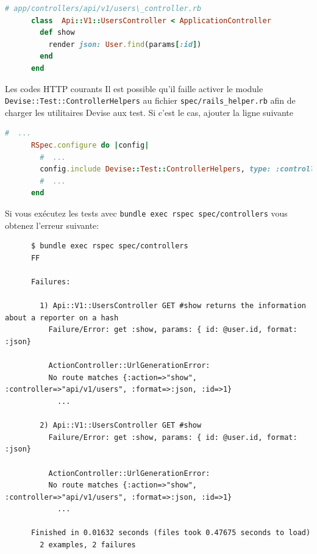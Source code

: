 \documentclass[]{report}
\begin{document}
    \begin{scriptsize}
      \begin{lstlisting}[language=ruby, caption={Le contrôlleur des utilisateurs avec l'action' 'show'}, label={lst:add_show_to_users_controller_spec}]
      # app/controllers/api/v1/users\_controller.rb
      class  Api::V1::UsersController < ApplicationController
        def show
          render json: User.find(params[:id])
        end
      end
      \end{lstlisting}
    \end{scriptsize}

    \begin{tcolorbox}{Les codes HTTP courants}
      Il est possible qu'il faille activer le module \verb|Devise::Test::ControllerHelpers| au fichier \verb|spec/rails_helper.rb| afin de charger les utilitaires Devise aux test. Si c'est le cas, ajouter la ligne suivante

      \begin{scriptsize}
      \begin{lstlisting}[language=ruby]
      #  ...
      RSpec.configure do |config|
        #  ...
        config.include Devise::Test::ControllerHelpers, type: :controller
        #  ...
      end
      \end{lstlisting}
      \end{scriptsize}
    \end{tcolorbox}

    Si vous exécutez les tests avec \verb|bundle exec rspec spec/controllers| vous obtenez l'erreur suivante:

    \begin{scriptsize}
      \begin{lstlisting}
      $ bundle exec rspec spec/controllers
      FF

      Failures:

        1) Api::V1::UsersController GET #show returns the information about a reporter on a hash
          Failure/Error: get :show, params: { id: @user.id, format: :json}

          ActionController::UrlGenerationError:
          No route matches {:action=>"show", :controller=>"api/v1/users", :format=>:json, :id=>1}
            ...

        2) Api::V1::UsersController GET #show
          Failure/Error: get :show, params: { id: @user.id, format: :json}

          ActionController::UrlGenerationError:
          No route matches {:action=>"show", :controller=>"api/v1/users", :format=>:json, :id=>1}
            ...

      Finished in 0.01632 seconds (files took 0.47675 seconds to load)
        2 examples, 2 failures
      \end{lstlisting}
    \end{scriptsize}
\end{document}
